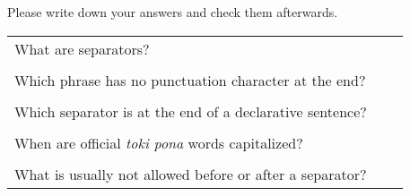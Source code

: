 Please write down your answers and check them afterwards. 

\begin{supertabular}{p{5cm}|ll}
What are separators? &&                                      \\ %
 && \\ %
Which phrase has no punctuation character at the end? &&     \\ %
 && \\ %
Which separator is at the end of a declarative sentence? &&  \\ %
 && \\ %
When are official \textit{toki pona} words capitalized? &&   \\ %
 && \\ %
What is usually not allowed before or after a separator? &&  \\ %

\end{supertabular} \\%
%
